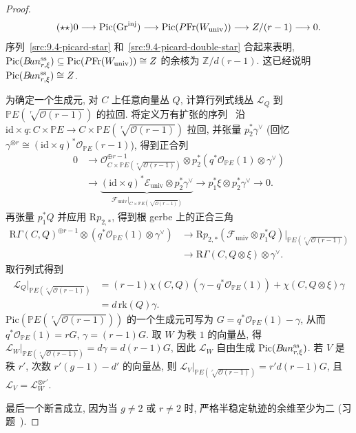 \begin{proof}
\begin{equation*}\tag{$\star\star$}\label{src:9.4-picard-double-star}
0\longrightarrow\mathrm{Pic}(\operatorname{Gr}^{\mathrm{inj}})\longrightarrow\mathrm{Pic}(P\mathrm{Fr}(W_{\mathrm{univ}}))\longrightarrow Z/(r-1)\longrightarrow0.
\end{equation*}
序列~\eqref{src:9.4-picard-star} 和~\eqref{src:9.4-picard-double-star} 合起来表明, $\mathrm{Pic}(B\!un_{r,\xi}^{\mathrm{ss}})\subseteq\mathrm{Pic}(P\mathrm{Fr}(W_{\mathrm{univ}}))\cong Z$ 的余核为 $\mathbb Z/d(r-1)$. 这已经说明 $\mathrm{Pic}(B\!un_{r,\xi}^{\mathrm{ss}})\cong Z$.

为确定一个生成元, 对 $C$ 上任意向量丛 $Q$, 计算行列式线丛 $\mathcal L_Q$ 到 $\mathbb PE(\sqrt[r]{\mathcal O(r-1)})$ 的拉回. 将定义万有扩张的序列~ 沿 $\mathrm{id}\times q:C\times\mathbb PE\to C\times\mathbb PE(\sqrt[r]{\mathcal O(r-1)})$ 拉回, 并张量 $p_2^*\gamma^\vee$ (回忆 $\gamma^{\otimes r}\cong(\mathrm{id}\times q)^*\mathcal O_{\mathbb PE}(r-1)$), 得到正合列
\[
\begin{aligned}
0&\longrightarrow\mathcal O_{C\times\mathbb PE(\sqrt[r]{\mathcal O(r-1)})}^{\oplus r-1}\otimes p_2^*(q^*\mathcal O_{\mathbb PE}(1)\otimes\gamma^\vee)\\
&\longrightarrow\underbrace{(\mathrm{id}\times q)^*\mathcal E_{\mathrm{univ}}\otimes p_2^*\gamma^\vee}_{\mathcal F_{\mathrm{univ}}|_{C\times\mathbb PE(\sqrt[r]{\mathcal O(r-1)})}}\longrightarrow p_1^*\xi\otimes p_2^*\gamma^\vee\longrightarrow0.
\end{aligned}
\]
再张量 $p_1^*Q$ 并应用 $\mathrm Rp_{2,*}$, 得到根 gerbe 上的正合三角
\[
\begin{aligned}
\mathrm R\Gamma(C,Q)^{\oplus r-1}\otimes(q^*\mathcal O_{\mathbb PE}(1)\otimes\gamma^\vee)&\longrightarrow\mathrm Rp_{2,*}(\mathcal F_{\mathrm{univ}}\otimes p_1^*Q)|_{\mathbb PE(\sqrt[r]{\mathcal O(r-1)})}\\
&\longrightarrow\mathrm R\Gamma(C,Q\otimes\xi)\otimes\gamma^\vee.
\end{aligned}
\]
取行列式得到
\[
\begin{aligned}
\mathcal L_Q|_{\mathbb PE(\sqrt[r]{\mathcal O(r-1)})}&=(r-1)\chi(C,Q)(\gamma-q^*\mathcal O_{\mathbb PE}(1))+\chi(C,Q\otimes\xi)\gamma\\
&=d\,\mathrm{rk}(Q)\gamma.
\end{aligned}
\]
$\mathrm{Pic}(\mathbb PE(\sqrt[r]{\mathcal O(r-1)}))$ 的一个生成元可写为 $G=q^*\mathcal O_{\mathbb PE}(1)-\gamma$, 从而 $q^*\mathcal O_{\mathbb PE}(1)=rG$, $\gamma=(r-1)G$. 取 $W$ 为秩 $1$ 的向量丛, 得 $\mathcal L_W|_{\mathbb PE(\sqrt[r]{\mathcal O(r-1)})}=d\gamma=d(r-1)G$, 因此 $\mathcal L_W$ 自由生成 $\mathrm{Pic}(B\!un_{r,\xi}^{\mathrm{ss}})$. 若 $V$ 是秩 $r'$, 次数 $r'(g-1)-d'$ 的向量丛, 则 $\mathcal L_V|_{\mathbb PE(\sqrt[r]{\mathcal O(r-1)})}=r'd(r-1)G$, 且 $\mathcal L_V=\mathcal L_W^{\otimes r'}$.

最后一个断言成立, 因为当 $g\neq2$ 或 $r\neq2$ 时, 严格半稳定轨迹的余维至少为二 (习题~).
\end{proof}
